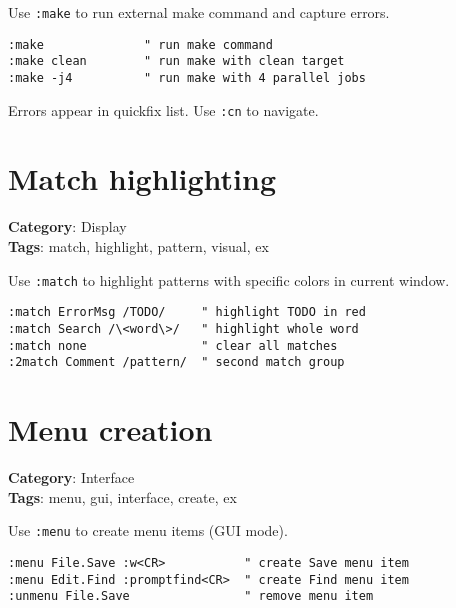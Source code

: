 {{{{{Use {\footnotesize \Verb§:make§} to run external make command and capture errors.

\begin{Exa*}{}
\begin{Verbatim}[fontsize=\footnotesize, breaklines, breakanywhere]
:make              " run make command
:make clean        " run make with clean target
:make -j4          " run make with 4 parallel jobs
\end{Verbatim}
\end{Exa*}

Errors appear in quickfix list. Use {\footnotesize \Verb§:cn§} to navigate.

\section{Match highlighting}

\textbf{Category}: Display\\ \textbf{Tags}: match, highlight, pattern, visual, ex
\vspace{0.5cm}

Use {\footnotesize \Verb§:match§} to highlight patterns with specific colors in current window.

\begin{Exa*}{}
\begin{Verbatim}[fontsize=\footnotesize, breaklines, breakanywhere]
:match ErrorMsg /TODO/     " highlight TODO in red
:match Search /\<word\>/   " highlight whole word
:match none                " clear all matches
:2match Comment /pattern/  " second match group
\end{Verbatim}
\end{Exa*}

\section{Menu creation}

\textbf{Category}: Interface\\ \textbf{Tags}: menu, gui, interface, create, ex
\vspace{0.5cm}

Use {\footnotesize \Verb§:menu§} to create menu items (GUI mode).

\begin{Exa*}{}
\begin{Verbatim}[fontsize=\footnotesize, breaklines, breakanywhere]
:menu File.Save :w<CR>           " create Save menu item
:menu Edit.Find :promptfind<CR>  " create Find menu item
:unmenu File.Save                " remove menu item
\end{Verbatim}
\end{Exa*}

}}}}}
